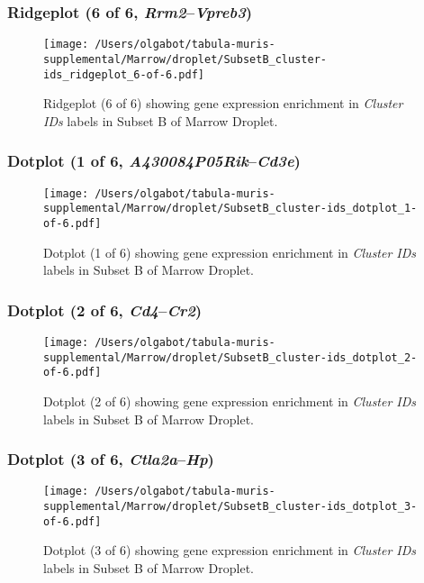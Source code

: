 \clearpage

\subsubsection{Ridgeplot (6 of 6, \emph{Rrm2}--\emph{Vpreb3})}
\begin{figure}[h]
\centering
\texttt{[image: /Users/olgabot/tabula-muris-supplemental/Marrow/droplet/SubsetB\_cluster-ids\_ridgeplot\_6-of-6.pdf]}

\caption{ Ridgeplot (6 of 6)  showing gene expression enrichment in \emph{Cluster IDs} labels in Subset B of Marrow Droplet. }
\end{figure}


\clearpage

\subsubsection{Dotplot (1 of 6, \emph{A430084P05Rik}--\emph{Cd3e})}
\begin{figure}[h]
\centering
\texttt{[image: /Users/olgabot/tabula-muris-supplemental/Marrow/droplet/SubsetB\_cluster-ids\_dotplot\_1-of-6.pdf]}

\caption{ Dotplot (1 of 6)  showing gene expression enrichment in \emph{Cluster IDs} labels in Subset B of Marrow Droplet. }
\end{figure}


\clearpage

\subsubsection{Dotplot (2 of 6, \emph{Cd4}--\emph{Cr2})}
\begin{figure}[h]
\centering
\texttt{[image: /Users/olgabot/tabula-muris-supplemental/Marrow/droplet/SubsetB\_cluster-ids\_dotplot\_2-of-6.pdf]}

\caption{ Dotplot (2 of 6)  showing gene expression enrichment in \emph{Cluster IDs} labels in Subset B of Marrow Droplet. }
\end{figure}


\clearpage

\subsubsection{Dotplot (3 of 6, \emph{Ctla2a}--\emph{Hp})}
\begin{figure}[h]
\centering
\texttt{[image: /Users/olgabot/tabula-muris-supplemental/Marrow/droplet/SubsetB\_cluster-ids\_dotplot\_3-of-6.pdf]}

\caption{ Dotplot (3 of 6)  showing gene expression enrichment in \emph{Cluster IDs} labels in Subset B of Marrow Droplet. }
\end{figure}


